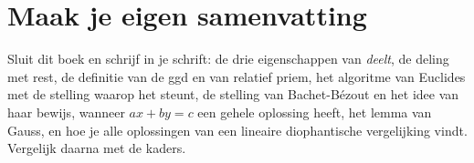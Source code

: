 \begin{oefeningen}


\end{oefeningen}


\begin{oefeningen}






\end{oefeningen}


\ifzelfstudie
\section*{Maak je eigen samenvatting}
Sluit dit boek en schrijf in je schrift: de drie eigenschappen van \textit{deelt}, de deling met rest, de definitie van de ggd en van relatief priem, het algoritme van Euclides met de stelling waarop het steunt, de stelling van Bachet-Bézout en het idee van haar bewijs, wanneer $ax + by = c$ een gehele oplossing heeft, het lemma van Gauss, en hoe je alle oplossingen van een lineaire diophantische vergelijking vindt. Vergelijk daarna met de kaders.
\fi
